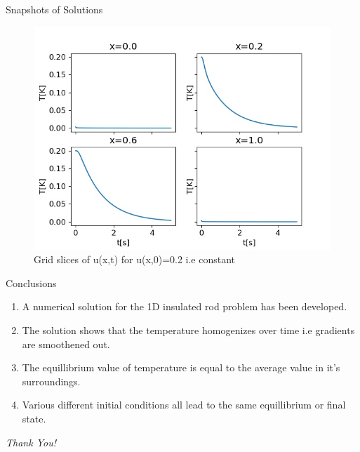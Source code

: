 \documentclass[10pt,compress]{beamer}
\begin{document}
\begin{frame}{Snapshots of Solutions}
\begin{figure}
\begin{center}
	\includegraphics[scale=0.5]{../plots/slice_1_0500_2000.jpg}
	\caption{Grid slices of u(x,t) for u(x,0)=0.2 i.e constant}
	\label{fig:const-slice}
\end{center}
\end{figure}
\end{frame}

\begin{frame}{Conclusions}
\begin{enumerate}
\item A numerical solution for the 1D insulated rod problem has been developed.
\item The solution shows that the temperature homogenizes over time i.e gradients are smoothened out.
\item The equillibrium value of temperature is equal to the average value in it's surroundings.
\item Various different initial conditions all lead to the same equillibrium or final state.
\end{enumerate}
\end{frame}


\begin{frame}{}
\centering \Huge
	\emph{Thank You!}
\end{frame}
\end{document}
